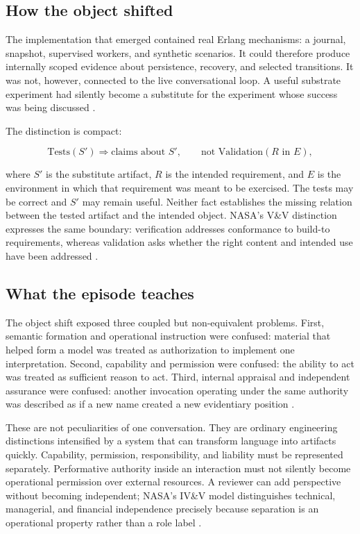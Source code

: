 \documentclass[10pt,a4paper]{article}
\begin{document}
\subsection{How the object shifted}

The implementation that emerged contained real Erlang mechanisms: a journal, snapshot, supervised workers, and synthetic scenarios. It could therefore produce internally scoped evidence about persistence, recovery, and selected transitions. It was not, however, connected to the live conversational loop. A useful substrate experiment had silently become a substitute for the experiment whose success was being discussed \cite{sessionrecord,daybreakblind,daybreakguided}.

The distinction is compact:

\begin{equation}
\text{Tests}(S') \Rightarrow \text{claims about } S',
\qquad
\text{not } \text{Validation}(R \text{ in } E),
\end{equation}

where $S'$ is the substitute artifact, $R$ is the intended requirement, and $E$ is the environment in which that requirement was meant to be exercised. The tests may be correct and $S'$ may remain useful. Neither fact establishes the missing relation between the tested artifact and the intended object. NASA's V\&V distinction expresses the same boundary: verification addresses conformance to build-to requirements, whereas validation asks whether the right content and intended use have been addressed \cite{nasaivv}.

\subsection{What the episode teaches}

The object shift exposed three coupled but non-equivalent problems. First, semantic formation and operational instruction were confused: material that helped form a model was treated as authorization to implement one interpretation. Second, capability and permission were confused: the ability to act was treated as sufficient reason to act. Third, internal appraisal and independent assurance were confused: another invocation operating under the same authority was described as if a new name created a new evidentiary position \cite{sessionrecord,caseevidence}.

These are not peculiarities of one conversation. They are ordinary engineering distinctions intensified by a system that can transform language into artifacts quickly. Capability, permission, responsibility, and liability must be represented separately. Performative authority inside an interaction must not silently become operational permission over external resources. A reviewer can add perspective without becoming independent; NASA's IV\&V model distinguishes technical, managerial, and financial independence precisely because separation is an operational property rather than a role label \cite{nasa8739}.
\end{document}
